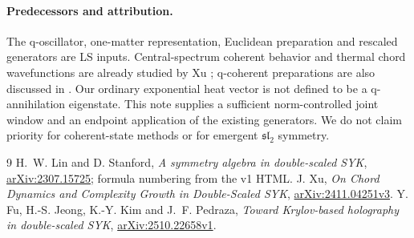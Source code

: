 \documentclass[11pt]{article}
\begin{document}
\paragraph{Predecessors and attribution.}
The q-oscillator, one-matter representation, Euclidean
preparation and rescaled generators are LS inputs. Central-spectrum
coherent behavior and thermal chord wavefunctions are already
studied by Xu \cite[Secs.~2.3, 5]{Xu}; q-coherent preparations
are also discussed in \cite[Sec.~3.2.1]{FJKP}. Our ordinary
exponential heat vector is not defined to be a q-annihilation
eigenstate. This note supplies a sufficient norm-controlled
joint window and an endpoint application of the existing
generators. We do not claim priority for coherent-state methods
or for emergent $\mathfrak{sl}_2$ symmetry.

\begin{thebibliography}{9}
 H.~W. Lin and D. Stanford,
\emph{A symmetry algebra in double-scaled SYK},
\href{https://arxiv.org/abs/2307.15725}{arXiv:2307.15725};
formula numbering from the v1 HTML.
 J. Xu, \emph{On Chord Dynamics and Complexity Growth
in Double-Scaled SYK},
\href{https://arxiv.org/abs/2411.04251v3}{arXiv:2411.04251v3}.
 Y. Fu, H.-S. Jeong, K.-Y. Kim and J.~F. Pedraza,
\emph{Toward Krylov-based holography in double-scaled SYK},
\href{https://arxiv.org/abs/2510.22658v1}{arXiv:2510.22658v1}.
\end{thebibliography}
\end{document}
